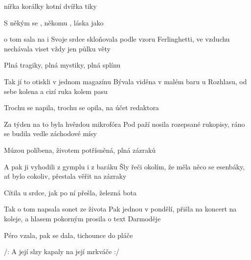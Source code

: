 
\zs
{} nířka  korálky  kotní   
  dvířka  tiky   

S někým se , někomu ,
láska jako 

 o tom sala  na i     
\ks
\zs
Svoje srdce skloňovala podle vzoru Ferlinghetti,
ve vzduchu nechávala viset vždy jen půlku věty

Plná tragiky, plná mystiky,
plná splínu

Tak jí to otiskli v jednom magazínu
\ks
\zs
Bývala viděna v malém baru u Rozhlasu,
od sebe kolena a cizí ruka kolem pasu

Trochu se napila, trochu se opila,
na účet redaktora

Za týden na to byla hvězdou mikrofóra
\ks
\zs
Pod paží nosila rozepsané rukopisy,
ráno se budila vedle záchodové mísy

Múzou políbena, životem potřísněná,
plná zázraků

A pak ji vyhodili z gymplu i z baráku
\ks
\zs
Šly řeči okolím, že měla něco se esenbáky,
ať bylo cokoliv, přestala věřit na zázraky

Cítila u srdce, jak po ní přešla,
železná bota

Tak o tom napsala sonet ze života
\ks
\zs
Pak jednou v pondělí, přišla na koncert na koleje,
a hlasem pokorným prosila o text Darmoděje

Péro vzala, pak se dala,
tichounce do pláče

/: A její slzy kapaly na její mrkváče :/
\ks
\kp





